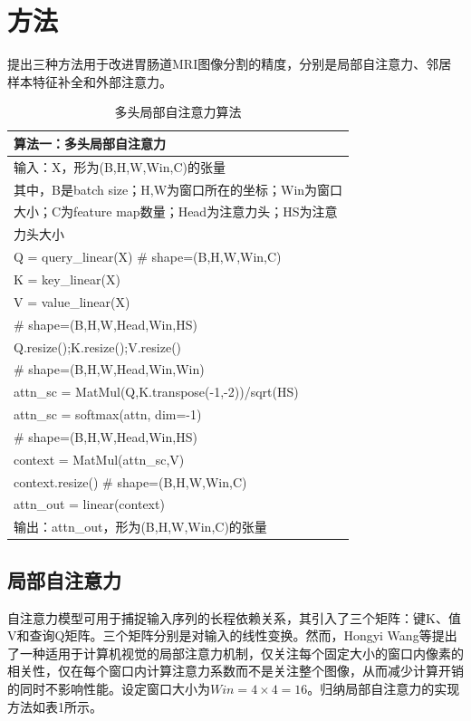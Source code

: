 \documentclass[letterpaper, 10pt, conference, twoside]{ieeeconf}
\begin{document}
\section{方法}
提出三种方法用于改进胃肠道MRI图像分割的精度，分别是局部自注意力、邻居样本特征补全和外部注意力。
\begin{table}[htbp]
  \centering
 \caption{多头局部自注意力算法}
 \label{tab:Algorithm1}
 \begin{tabular}{l}
  \toprule
  \textbf{算法一：多头局部自注意力} \\
  \midrule
    输入：X，形为(B,H,W,Win,C)的张量 \\
    其中，B是batch size；H,W为窗口所在的坐标；Win为窗口\\
    大小；C为feature map数量；Head为注意力头；HS为注意\\
    力头大小\\
    Q = query\_linear(X)  \# shape=(B,H,W,Win,C)\\
    K = key\_linear(X)\\
    V = value\_linear(X)\\
    \# shape=(B,H,W,Head,Win,HS)\\
    Q.resize();K.resize();V.resize() \\
    \# shape=(B,H,W,Head,Win,Win)\\
    attn\_sc = MatMul(Q,K.transpose(-1,-2))/sqrt(HS)\\
    attn\_sc = softmax(attn, dim=-1)\\
    \# shape=(B,H,W,Head,Win,HS)\\
    context = MatMul(attn\_sc,V)\\
    context.resize()  \# shape=(B,H,W,Win,C)\\
    attn\_out = linear(context)\\
    输出：attn\_out，形为(B,H,W,Win,C)的张量\\

  \bottomrule
 \end{tabular}
\end{table}
\subsection{局部自注意力}
自注意力模型\cite{attention}可用于捕捉输入序列的长程依赖关系，其引入了三个矩阵：键K、值V和查询Q矩阵。三个矩阵分别是对输入的线性变换。然而，Hongyi Wang\cite{MTM}等提出了一种适用于计算机视觉的局部注意力机制，仅关注每个固定大小的窗口内像素的相关性，仅在每个窗口内计算注意力系数而不是关注整个图像，从而减少计算开销的同时不影响性能。设定窗口大小为$Win = 4\times4=16$。归纳局部自注意力的实现方法如表1所示。
\end{document}
